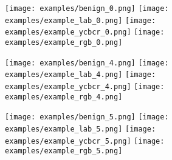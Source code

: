 \begin{figure}[!b]

    \begin{subfigure}[b]{\linewidth}
        \caption{}

        \texttt{[image: examples/benign\_0.png]}
        \texttt{[image: examples/example\_lab\_0.png]}
        \texttt{[image: examples/example\_ycbcr\_0.png]}
        \texttt{[image: examples/example\_rgb\_0.png]}
    \end{subfigure}

    \begin{subfigure}[b]{\linewidth}
        \caption{}
        \texttt{[image: examples/benign\_4.png]}
        \texttt{[image: examples/example\_lab\_4.png]}
        \texttt{[image: examples/example\_ycbcr\_4.png]}
        \texttt{[image: examples/example\_rgb\_4.png]}
    \end{subfigure}

    \begin{subfigure}[b]{\linewidth}
        \caption{}
        \texttt{[image: examples/benign\_5.png]}
        \texttt{[image: examples/example\_lab\_5.png]}
        \texttt{[image: examples/example\_ycbcr\_5.png]}
        \texttt{[image: examples/example\_rgb\_5.png]}
    \end{subfigure}
\end{figure}

